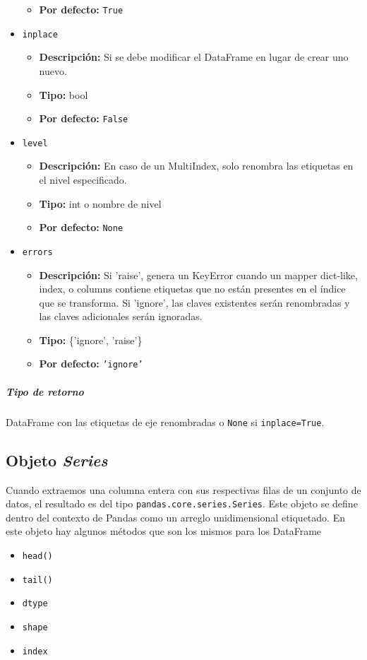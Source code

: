 \begin{itemize}
\begin{itemize}
\item \textbf{Por defecto:} \texttt{True}
\end{itemize}
\item \texttt{inplace}
\begin{itemize}
\item \textbf{Descripción:} Si se debe modificar el DataFrame en lugar de crear uno nuevo.
\item \textbf{Tipo:} bool
\item \textbf{Por defecto:} \texttt{False}
\end{itemize}
\item \texttt{level}
\begin{itemize}
\item \textbf{Descripción:} En caso de un MultiIndex, solo renombra las etiquetas en el nivel especificado.
\item \textbf{Tipo:} int o nombre de nivel
\item \textbf{Por defecto:} \texttt{None}
\end{itemize}
\item \texttt{errors}
\begin{itemize}
\item \textbf{Descripción:} Si 'raise', genera un KeyError cuando un mapper dict-like, index, o columns contiene etiquetas que no están presentes en el índice que se transforma. Si 'ignore', las claves existentes serán renombradas y las claves adicionales serán ignoradas.
\item \textbf{Tipo:} \{'ignore', 'raise'\}
\item \textbf{Por defecto:} \texttt{'ignore'}
\end{itemize}
\end{itemize}
\subparagraph{Tipo de retorno}
DataFrame con las etiquetas de eje renombradas o \texttt{None} si \texttt{inplace=True}.
\subsection{Objeto \textit{Series}}
Cuando extraemos una columna entera con sus respectivas filas de un conjunto de datos, el resultado es del tipo \texttt{pandas.core.series.Series}. Este objeto se define dentro del contexto de Pandas como un arreglo unidimensional etiquetado. 
En este objeto hay algunos métodos que son los mismos para los DataFrame
\begin{itemize}
\item \texttt{head()}
\item \texttt{tail()}
\item \texttt{dtype}
\item \texttt{shape}
\item \texttt{index}
\end{itemize}
